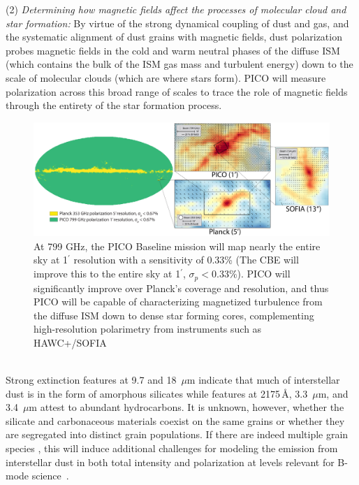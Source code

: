 \documentclass[PICOReport.tex]{subfiles}
\begin{document}
(2) {\em Determining how magnetic fields affect the processes of molecular cloud and star formation:}
By virtue of the strong dynamical coupling of dust and gas, and the systematic alignment of dust grains with magnetic fields, dust polarization probes magnetic fields in the cold and warm neutral phases of the diffuse \ac{ISM} (which contains the bulk of the \ac{ISM} gas mass and turbulent energy) down to the scale of molecular clouds (which are where stars form).  PICO will measure polarization across this broad range of scales to trace the role of magnetic fields through the entirety of the star formation process. 
%
%
\begin{figure}
    \centering
    \includegraphics[width=6.5in]{images/galsci_fig_v4.pdf}
    \caption{At 799 GHz, the PICO Baseline mission will map nearly the entire sky at 1$^{\prime}$ resolution with a sensitivity of 0.33\% (The CBE will improve this to the entire sky at 1$^\prime$, $\sigma_p<0.33\%$). PICO will significantly improve over Planck's coverage and resolution, and thus PICO will be capable of characterizing magnetized turbulence from the diffuse ISM down to dense star forming cores, complementing high-resolution polarimetry from instruments such as HAWC+/SOFIA \citep{Chuss2018}}
    \label{fig:allsky}
\end{figure}

\vspace{0.1in}
 \\
Strong extinction features at 9.7 and 18~$\mu$m indicate that much of interstellar dust is in the form of amorphous silicates while features at 2175\,\AA, 3.3~$\mu$m, and 3.4~$\mu$m attest to abundant hydrocarbons. It is unknown, however, whether the silicate and carbonaceous materials coexist on the same grains or whether they are segregated into distinct grain populations. If there are indeed multiple grain species , this will induce additional challenges for modeling the emission from interstellar dust in both total intensity and polarization at levels relevant for B-mode science~\citep{Hensley2018}. 
\end{document}
